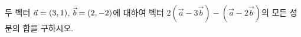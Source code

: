 두 벡터 $\vec{a}=(3{,}\mkern3mu\mathopen{}1)$, $\vec{b}=(2{,}\mkern3mu\mathopen{}-2)$에 대하여 벡터 $2(\vec{a}-3\vec{b})-(\vec{a}-2\vec{b})$의 모든 성분의 합을 구하시오.
